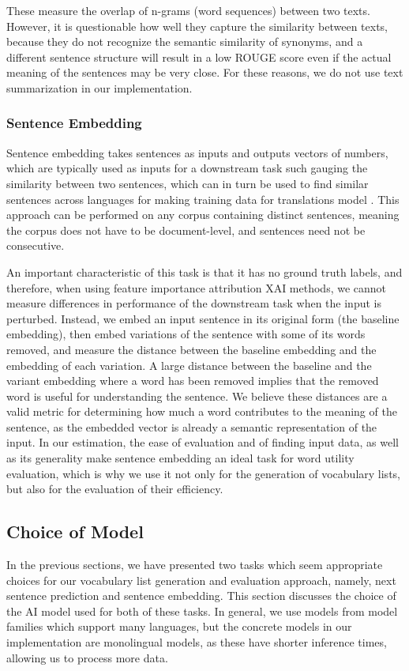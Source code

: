 These measure the overlap of n-grams (word sequences) between two texts.
However, it is questionable how well they capture the similarity between texts, because they do not recognize the semantic similarity of synonyms, and a different sentence structure will result in a low ROUGE score even if the actual meaning of the sentences may be very close.
For these reasons, we do not use text summarization in our implementation.

\subsubsection{Sentence Embedding} \label{sec:sentence-embedding}
Sentence embedding takes sentences as inputs and outputs vectors of numbers, which are typically used as inputs for a downstream task such gauging the similarity between two sentences, which can in turn be used to find similar sentences across languages for making training data for translations model \cite{artetxeMassivelyMultilingualSentence2019} \cite{reimersMakingMonolingualSentence2020}.
This approach can be performed on any corpus containing distinct sentences, meaning the corpus does not have to be document-level, and sentences need not be consecutive.

An important characteristic of this task is that it has no ground truth labels, and therefore, when using feature importance attribution XAI methods, we cannot measure differences in performance of the downstream task when the input is perturbed.
Instead, we embed an input sentence in its original form (the baseline embedding), then embed variations of the sentence with some of its words removed, and measure the distance between the baseline embedding and the embedding of each variation.
A large distance between the baseline and the variant embedding where a word has been removed implies that the removed word is useful for understanding the sentence.
We believe these distances are a valid metric for determining how much a word contributes to the meaning of the sentence, as the embedded vector is already a semantic representation of the input.
In our estimation, the ease of evaluation and of finding input data, as well as its generality make sentence embedding an ideal task for word utility evaluation, which is why we use it not only for the generation of vocabulary lists, but also for the evaluation of their efficiency.

\subsection{Choice of Model}
In the previous sections, we have presented two tasks which seem appropriate choices for our vocabulary list generation and evaluation approach, namely, next sentence prediction and sentence embedding.
This section discusses the choice of the AI model used for both of these tasks.
In general, we use models from model families which support many languages, but the concrete models in our implementation are monolingual models, as these have shorter inference times, allowing us to process more data.

